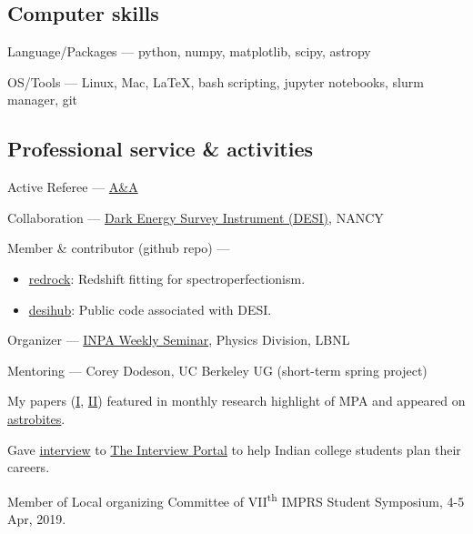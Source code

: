 \documentclass[12pt,letterpaper]{article}
\begin{document}
\subsection{Computer skills}
\begin{list}{}{\cvlist}
\item Language/Packages ---  
    python, numpy, matplotlib, scipy, astropy
\item OS/Tools --- Linux, Mac, \LaTeX, bash scripting, jupyter notebooks, slurm manager, git
\end{list}

\subsection{Professional service \& activities}
\begin{list}{}{\cvlist}
    \item Active Referee ---
    \href{https://en.wikipedia.org/wiki/Astronomy_%26_Astrophysics}{A\&A}
    \item Collaboration ---
        \href{https://www.desi.lbl.gov/}{Dark Energy Survey Instrument (DESI)}, NANCY
    \item Member \& contributor (github repo) ---
    \begin{itemize}
      \item[] \href{https://github.com/desihub/redrock}{redrock}: Redshift fitting for spectroperfectionism.
      \item[] \href{https://github.com/desihub}{desihub}: Public code associated with DESI.
    \end{itemize}
    \item Organizer ---
        \href{https://inpa.lbl.gov/events/}{INPA Weekly Seminar}, Physics Division, LBNL
    \item Mentoring ---
        Corey Dodeson, UC Berkeley UG (short-term spring project)
    \item My papers (\href{https://www.mpa-garching.mpg.de/964620/hl202107}{I}, \href{https://www.mpa-garching.mpg.de/1066558/hl202211?c=27981}{II}) featured in monthly research highlight of MPA and appeared on \href{https://astrobites.org/2021/05/06/cool-metal-gas-search-thanks-it-was-automated/}{astrobites}.
    \item Gave \href{https://theinterviewportal.com/2020/03/13/astrophysicist-interview-8/}{interview} to \href{https://theinterviewportal.com/}{The Interview Portal} to help Indian college students plan their careers. 
    \item Member of Local organizing Committee of VII\textsuperscript{th} IMPRS Student Symposium, 4-5 Apr, 2019.

\end{list}
\end{document}
